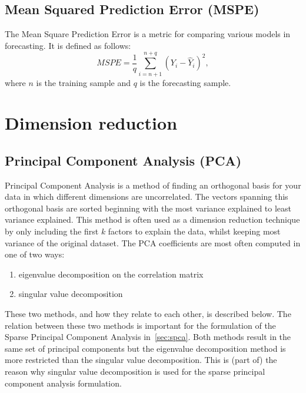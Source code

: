 \subsection{Mean Squared Prediction Error (MSPE)}
\label{sec:mspe}
The Mean Square Prediction Error is a metric for comparing various models in forecasting.
It is defined as follows:
\begin{equation}
	MSPE = \frac{1}{q} \sum_{i=n+1}^{n+q} \left(Y_i - \hat{Y}_i \right)^2,
\end{equation}
where $n$ is the training sample and $q$ is the forecasting sample.

\section{Dimension reduction}
\label{sec:dimension-reduction}
\subsection{Principal Component Analysis (PCA)}
Principal Component Analysis is a method of finding an orthogonal basis for your data in which different dimensions are uncorrelated. 
The vectors spanning this orthogonal basis are sorted beginning with the most variance explained to least variance explained. 
This method is often used as a dimension reduction technique by only including the first $k$ factors to explain the data, whilst keeping most variance of the original dataset. 
The PCA coefficients are most often computed in one of two ways:
\begin{enumerate}
	\item eigenvalue decomposition on the correlation matrix
	\item singular value decomposition
\end{enumerate}
These two methods, and how they relate to each other, is described below. 
The relation between these two methods is important for the formulation of the Sparse Principal Component Analysis in~\cref{sec:spca}.
Both methods result in the same set of principal components but the eigenvalue decomposition method is more restricted than the singular value decomposition. 
This is (part of) the reason why singular value decomposition is used for the sparse principal component analysis formulation.


